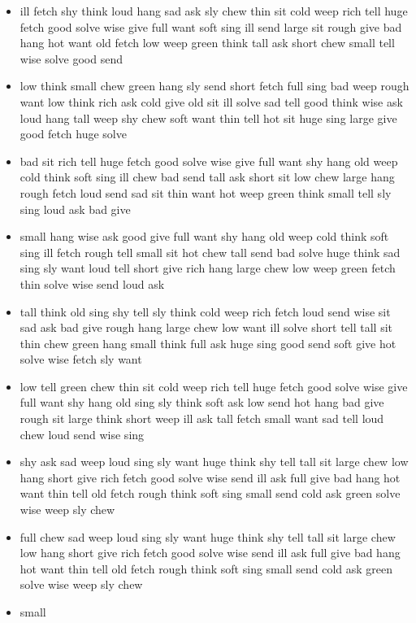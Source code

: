 \documentclass[10pt,letterpaper]{article}
\begin{document}
\begin{flushleft}
\begin{itemize}
  \item ill
fetch
shy
think
loud
hang
sad
ask
sly
chew
thin
sit
cold
weep
rich
tell
huge
fetch
good
solve
wise
give
full
want
soft
sing
ill
send
large
sit
rough
give
bad
hang
hot
want
old
fetch
low
weep
green
think
tall
ask
short
chew
small
tell
wise
solve
good
send

  \item low
think
small
chew
green
hang
sly
send
short
fetch
full
sing
bad
weep
rough
want
low
think
rich
ask
cold
give
old
sit
ill
solve
sad
tell
good
think
wise
ask
loud
hang
tall
weep
shy
chew
soft
want
thin
tell
hot
sit
huge
sing
large
give
good
fetch
huge
solve

  \item bad
sit
rich
tell
huge
fetch
good
solve
wise
give
full
want
shy
hang
old
weep
cold
think
soft
sing
ill
chew
bad
send
tall
ask
short
sit
low
chew
large
hang
rough
fetch
loud
send
sad
sit
thin
want
hot
weep
green
think
small
tell
sly
sing
loud
ask
bad
give
  \item small
hang
wise
ask
good
give
full
want
shy
hang
old
weep
cold
think
soft
sing
ill
fetch
rough
tell
small
sit
hot
chew
tall
send
bad
solve
huge
think
sad
sing
sly
want
loud
tell
short
give
rich
hang
large
chew
low
weep
green
fetch
thin
solve
wise
send
loud
ask
  \item tall
think
old
sing
shy
tell
sly
think
cold
weep
rich
fetch
loud
send
wise
sit
sad
ask
bad
give
rough
hang
large
chew
low
want
ill
solve
short
tell
tall
sit
thin
chew
green
hang
small
think
full
ask
huge
sing
good
send
soft
give
hot
solve
wise
fetch
sly
want
  \item low
tell
green
chew
thin
sit
cold
weep
rich
tell
huge
fetch
good
solve
wise
give
full
want
shy
hang
old
sing
sly
think
soft
ask
low
send
hot
hang
bad
give
rough
sit
large
think
short
weep
ill
ask
tall
fetch
small
want
sad
tell
loud
chew
loud
send
wise
sing
  \item shy
ask
sad
weep
loud
sing
sly
want
huge
think
shy
tell
tall
sit
large
chew
low
hang
short
give
rich
fetch
good
solve
wise
send
ill
ask
full
give
bad
hang
hot
want
thin
tell
old
fetch
rough
think
soft
sing
small
send
cold
ask
green
solve
wise
weep
sly
chew
  \item full
chew
sad
weep
loud
sing
sly
want
huge
think
shy
tell
tall
sit
large
chew
low
hang
short
give
rich
fetch
good
solve
wise
send
ill
ask
full
give
bad
hang
hot
want
thin
tell
old
fetch
rough
think
soft
sing
small
send
cold
ask
green
solve
wise
weep
sly
chew
  \item small

\end{itemize}
\end{flushleft}
\end{document}
